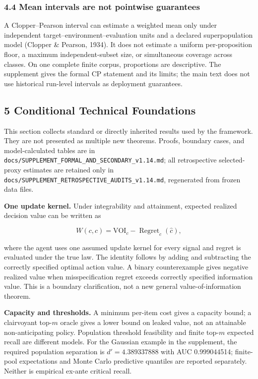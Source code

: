 \documentclass[
  11pt]{article}
\begin{document}
\subsubsection{4.4 Mean intervals are not pointwise
guarantees}\label{mean-intervals-are-not-pointwise-guarantees}

A Clopper--Pearson interval can estimate a weighted mean only under
independent target--environment--evaluation units and a declared
superpopulation model (Clopper \& Pearson, 1934). It does not estimate a
uniform per-proposition floor, a maximum independent-subset size, or
simultaneous coverage across classes. On one complete finite corpus,
proportions are descriptive. The supplement gives the formal CP
statement and its limits; the main text does not use historical
run-level intervals as deployment guarantees.

\subsection{5 Conditional Technical
Foundations}\label{conditional-technical-foundations}

This section collects standard or directly inherited results used by the
framework. They are not presented as multiple new theorems. Proofs,
boundary cases, and model-calculated tables are in
\texttt{docs/SUPPLEMENT\_FORMAL\_AND\_SECONDARY\_v1.14.md}; all
retrospective selected-proxy estimates are retained only in
\texttt{docs/SUPPLEMENT\_RETROSPECTIVE\_AUDITS\_v1.14.md}, regenerated
from frozen data files.

\textbf{One update kernel.} Under integrability and attainment, expected
realized decision value can be written as

\[W(c,\hat c)=\mathrm{VOI}_c-\operatorname{Regret}_c(\hat c),\tag{7}\]

where the agent uses one assumed update kernel for every signal and
regret is evaluated under the true law. The identity follows by adding
and subtracting the correctly specified optimal action value. A binary
counterexample gives negative realized value when misspecification
regret exceeds correctly specified information value. This is a boundary
clarification, not a new general value-of-information theorem.

\textbf{Capacity and thresholds.} A minimum per-item cost gives a
capacity bound; a clairvoyant top-\(m\) oracle gives a lower bound on
leaked value, not an attainable non-anticipating policy. Population
threshold feasibility and finite top-\(m\) expected recall are different
models. For the Gaussian example in the supplement, the required
population separation is \(d'=4.389337888\) with AUC 0.999044514;
finite-pool expectations and Monte Carlo predictive quantiles are
reported separately. Neither is empirical ex-ante critical recall.
\end{document}
